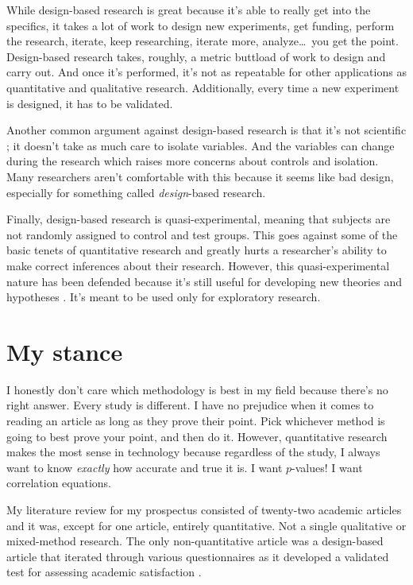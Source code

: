 \documentclass[man,natbib]{apa6}
\begin{document}
While design-based research is great because it's able to really get into the specifics, it takes a lot of work to design new experiments, get funding, perform the research, iterate, keep researching, iterate more, analyze\dots\ you get the point. Design-based research takes, roughly, a metric buttload of work to design and carry out. And once it's performed, it's not as repeatable for other applications as quantitative and qualitative research. Additionally, every time a new experiment is designed, it has to be validated.

Another common argument against design-based research is that it's not scientific \citep{shavelson2003science}; it doesn't take as much care to isolate variables. And the variables can change during the research which raises more concerns about controls and isolation. Many researchers aren't comfortable with this because it seems like bad design, especially for something called \emph{design}-based research.

Finally, design-based research is quasi-experimental, meaning that subjects are not randomly assigned to control and test groups. This goes against some of the basic tenets of quantitative research and greatly hurts a researcher's ability to make correct inferences about their research. However, this quasi-experimental nature has been defended because it's still useful for developing new theories and hypotheses \citep{brown1992design}. It's meant to be used only for exploratory research.

\section{My stance}
I honestly don't care which methodology is best in my field because there's no right answer. Every study is different. I have no prejudice when it comes to reading an article as long as they prove their point. Pick whichever method is going to best prove your point, and then do it. However, quantitative research makes the most sense in technology because regardless of the study, I always want to know \emph{exactly} how accurate and true it is. I want $p$-values! I want correlation equations.

My literature review for my prospectus consisted of twenty-two academic articles and it was, except for one article, entirely quantitative. Not a single qualitative or mixed-method research. The only non-quantitative article was a design-based article that iterated through various questionnaires as it developed a validated test for assessing academic satisfaction \citep{nauta2007assessing}.
\end{document}

